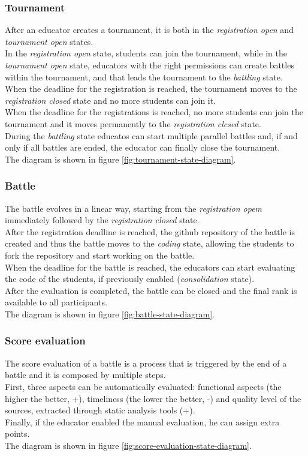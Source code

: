\subsubsection*{Tournament}
After an educator creates a tournament, it is both in the \textit{registration open} and \textit{tournament open} states.\\
In the \textit{registration open} state, students can join the tournament, while in the \textit{tournament open} state, educators with the right permissions can create battles within the tournament, and that leads the tournament to the \textit{battling} state.\\
When the deadline for the registration is reached, the tournament moves to the \textit{registration closed} state and no more students can join it.\\
When the deadline for the registrations is reached, no more students can join the tournament and it moves permanently to the \textit{registration clcsed} state.\\
During the \textit{battling} state educatos can start multiple parallel battles and, if and only if all battles are ended, the educator can finally close the tournament.\\
The diagram is shown in figure \ref{fig:tournament-state-diagram}.

\subsubsection*{Battle}
The battle evolves in a linear way, starting from the \textit{registration opem} immediately followed by the \textit{registration closed} state.\\
After the registration deadline is reached, the github repository of the battle is created and thus the battle moves to the \textit{coding} state, allowing the students to fork the repository and start working on the battle.\\
When the deadline for the battle is reached, the educators can start evaluating the code of the students, if previously enabled (\textit{consolidation} state). \\
After the evaluation is completed, the battle can be closed and the final rank is available to all participants.\\
The diagram is shown in figure \ref{fig:battle-state-diagram}.

\subsubsection*{Score evaluation}
The score evaluation of a battle is a process that is triggered by the end of a battle and it is composed by multiple steps.\\
First, three aspects can be automatically evaluated: functional aspects (the higher the better, +), timeliness (the lower the better, -) and quality level of the sources, extracted through static analysis tools (+). \\
Finally, if the educator enabled the manual evaluation, he can assign extra points. \\
The diagram is shown in figure \ref{fig:score-evaluation-state-diagram}.

